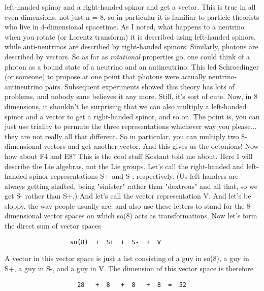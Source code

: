 left-handed spinor and a right-handed spinor and get a vector.  This is true 
in all even dimensions, not just n = 8, so in particular it is familiar to
particle theorists who live in 4-dimensional spacetime.   As I noted, 
what happens to a neutrino when you rotate (or Lorentz transform) it
is described using left-handed spinors, while anti-neutrinos are described
by right-handed spinors.  Similarly, photons are described by vectors.  
So as far as \emph{rotational} properties go, one could think of a photon as
a bound state of a neutrino and an antineutrino.  This led Schroedinger 
(or someone) to propose at one point that photons were actually neutrino-
antineutrino pairs.  Subsequent experiments showed this theory has lots of 
problems, and nobody sane believes it any more.   Still, it's sort of
cute.
Now, in 8 dimensions, it shouldn't be surprising that we can also 
multiply a left-handed spinor and a vector to get a right-handed 
spinor, and so on.  The point is, you can just use triality to permute the
three representations whichever way you please... they are not really
all that different.  
So in particular, you can multiply two 8-dimensional vectors and get 
another vector.  And this gives us the octonions!  
Now how about F4 and E8?  This is the cool stuff Kostant told me about.
Here I will describe the Lie algebras, not the Lie groups.  
Let's call the right-handed and left-handed spinor representations
S+ and S-, respectively.  (Us left-handers are always getting shafted,
being "sinister" rather than "dextrous" and all that, so we get S-
rather than S+.)  And let's call the vector representation V.   And let's
be sloppy, the way people usually are, and also use these letters to stand 
for the 8-dimensional vector spaces on which so(8) acts as transformations.
Now let's form the direct sum of vector spaces
\begin{verbatim}
                  so(8)  +  S+  +  S-  +  V
\end{verbatim}
    
A vector in this vector space is just a list consisting of a 
guy in so(8), a guy in S+, a guy in S-, and a guy in V.  The
dimension of this vector space is therefore
\begin{verbatim}
                    28   +  8   +  8   +  8  =  52
\end{verbatim}
    

